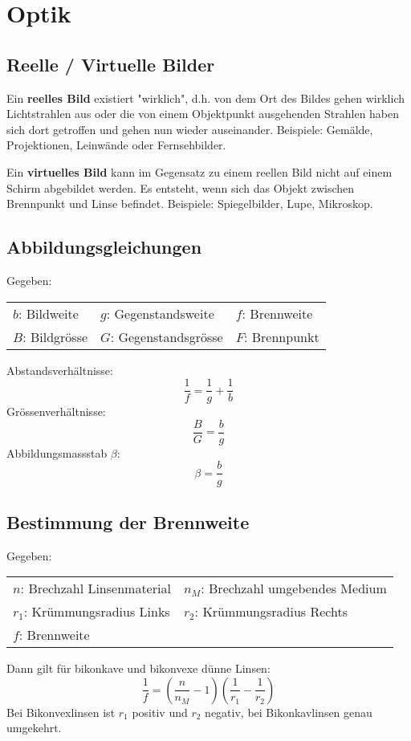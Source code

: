 \section{Optik}

\subsection{Reelle / Virtuelle Bilder}

Ein \textbf{reelles Bild} existiert "wirklich", d.h. von dem Ort des Bildes
gehen wirklich Lichtstrahlen aus oder die von einem Objektpunkt ausgehenden
Strahlen haben sich dort getroffen und gehen nun wieder auseinander. Beispiele:
Gemälde, Projektionen, Leinwände oder Fernsehbilder.

Ein \textbf{virtuelles Bild} kann im Gegensatz zu einem reellen Bild nicht auf
einem Schirm abgebildet werden. Es entsteht, wenn sich das Objekt zwischen
Brennpunkt und Linse befindet. Beispiele: Spiegelbilder, Lupe, Mikroskop.

\subsection{Abbildungsgleichungen}

Gegeben:

\begin{tabular}{lll}
	$b$: Bildweite & $g$: Gegenstandsweite & $f$: Brennweite \\
	$B$: Bildgrösse & $G$: Gegenstandsgrösse & $F$: Brennpunkt
\end{tabular}

Abstandsverhältnisse:
\[
	\frac{1}{f} = \frac{1}{g} + \frac{1}{b}
\]
Grössenverhältnisse:
\[
	\frac{B}{G} = \frac{b}{g}
\]
Abbildungsmassstab $\beta$:
\[
	\beta = \frac{b}{g}
\]

\subsection{Bestimmung der Brennweite}

Gegeben:

\begin{tabular}{ll}
$n$: Brechzahl Linsenmaterial & $n_M$: Brechzahl umgebendes Medium \\
$r_1$: Krümmungsradius Links & $r_2$: Krümmungsradius Rechts \\
$f$: Brennweite & \\
\end{tabular}

Dann gilt für bikonkave und bikonvexe dünne Linsen:
\[
	\frac{1}{f} = \left(\frac{n}{n_M} - 1\right) \left(\frac{1}{r_1} - \frac{1}{r_2}\right)
\]
Bei Bikonvexlinsen ist $r_1$ positiv und $r_2$ negativ, bei Bikonkavlinsen genau
umgekehrt.

